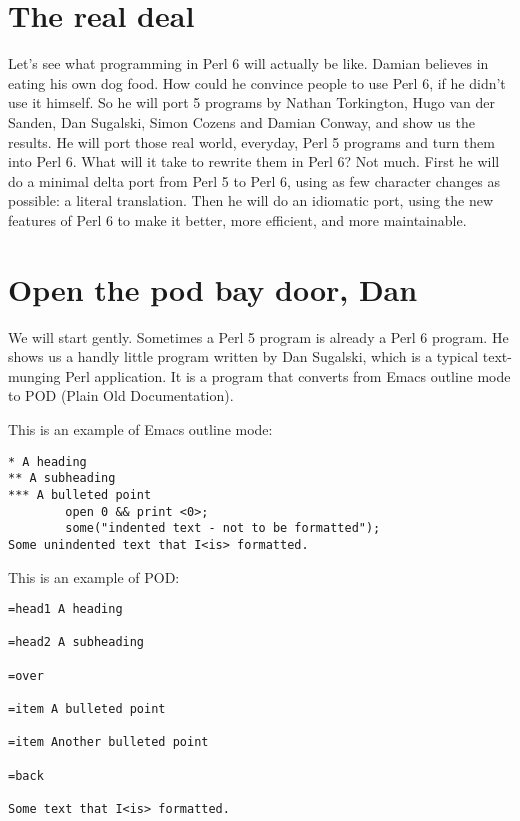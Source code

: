 \documentclass{article}
\newenvironment{example}
  {\addtolength{\linewidth}{-\parindent}%
   \null\begin{minipage}{\linewidth}}
  {\end{minipage}\addtolength{\linewidth}{\parindent}\null}
\begin{document}
\section{The real deal}
Let's see what programming in Perl 6 will actually be like.  Damian
believes in eating his own dog food.  How could he convince people to
use Perl 6, if he didn't use it himself.  So he will port 5 programs by
Nathan Torkington, Hugo van der Sanden, Dan Sugalski, Simon Cozens and
Damian Conway, and show us the results.  He will port those real world,
everyday, Perl 5 programs and turn them into Perl 6.  What will it take
to rewrite them in Perl 6?  Not much.  First he will do a minimal delta
port from Perl 5 to Perl 6, using as few character changes as possible:
a literal translation.  Then he will do an idiomatic port, using the
new features of Perl 6 to make it better, more efficient, and more
maintainable.

\section{Open the pod bay door, Dan}
We will start gently.  Sometimes a Perl 5 program is already a Perl 6
program.  He shows us a handly little program written by Dan Sugalski,
which is a
typical text-munging Perl application.  It is a program that converts
from Emacs outline mode to POD (Plain Old Documentation).

\begin{example}
This is an example of Emacs outline mode:
\begin{verbatim}
* A heading
** A subheading
*** A bulleted point
        open 0 && print <0>;
        some("indented text - not to be formatted");
Some unindented text that I<is> formatted.

\end{verbatim}
\end{example}

\begin{example}
This is an example of POD:
\begin{verbatim}
=head1 A heading

=head2 A subheading

=over

=item A bulleted point

=item Another bulleted point

=back

Some text that I<is> formatted.

\end{verbatim}
\end{example}
\end{document}
